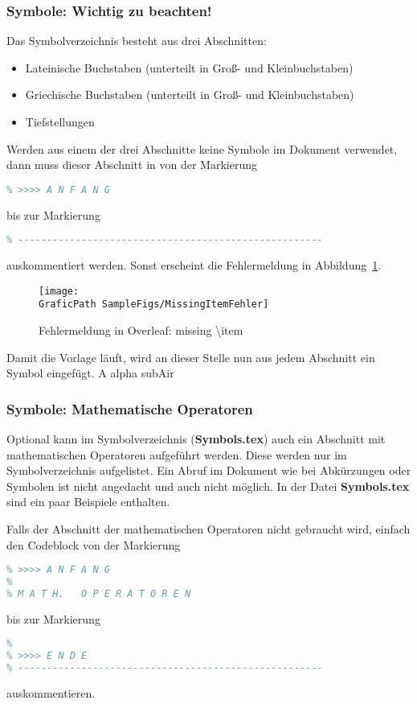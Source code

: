\subsubsection{Symbole: Wichtig zu beachten!}
\label{sec:Beispiele_SymboleAbk_Beachten}
%
Das Symbolverzeichnis besteht aus drei Abschnitten:
\begin{itemize}
    \item Lateinische Buchstaben (unterteilt in Groß- und Kleinbuchstaben)
    \item Griechische Buchstaben (unterteilt in Groß- und Kleinbuchstaben)
    \item Tiefstellungen
\end{itemize}
Werden aus einem der drei Abschnitte keine Symbole im Dokument verwendet, dann muss dieser Abschnitt in von der Markierung
%
\begin{lstlisting}[language=tex]
% -----------------------------------------------------
% >>>> A N F A N G 
\end{lstlisting}
%
bis zur Markierung
%
\begin{lstlisting}[language=tex]
% >>>> E N D E
% -----------------------------------------------------
\end{lstlisting}
%
auskommentiert werden.
Sonst erscheint die Fehlermeldung in Abbildung~\ref{fig:MissingItemFehler}.
%
\begin{figure}[htb]
    \centering
    \texttt{[image: \\GraficPath SampleFigs/MissingItemFehler]}
    \caption{Fehlermeldung in Overleaf: missing \textbackslash item}
    \label{fig:MissingItemFehler}
\end{figure}
%
Damit die Vorlage läuft, wird an dieser Stelle nun aus jedem Abschnitt ein Symbol eingefügt.
\acs{A} \acs{alpha} \acs{subAir}
%
%
%
\subsubsection{Symbole: Mathematische Operatoren}
\label{sec:Beispiele_SymboleAbk_MathOp}
%
Optional kann im Symbolverzeichnis (\textbf{Symbols.tex}) auch ein Abschnitt mit mathematischen Operatoren aufgeführt werden.
Diese werden nur im Symbolverzeichnis aufgelistet.
Ein Abruf im Dokument wie bei Abkürzungen oder Symbolen ist nicht angedacht und auch nicht möglich.
In der Datei \textbf{Symbols.tex} sind ein paar Beispiele enthalten.
\par
Falls der Abschnitt der mathematischen Operatoren nicht gebraucht wird, einfach den Codeblock von der Markierung
%
\begin{lstlisting}[language=tex]
% -----------------------------------------------------
% >>>> A N F A N G 
%
% M A T H.   O P E R A T O R E N
\end{lstlisting}
%
bis zur Markierung
%
\begin{lstlisting}[language=tex]
% M A T H.   O P E R A T O R E N
%
% >>>> E N D E
% -----------------------------------------------------
\end{lstlisting}
%
auskommentieren.
%
%
%
%
%
